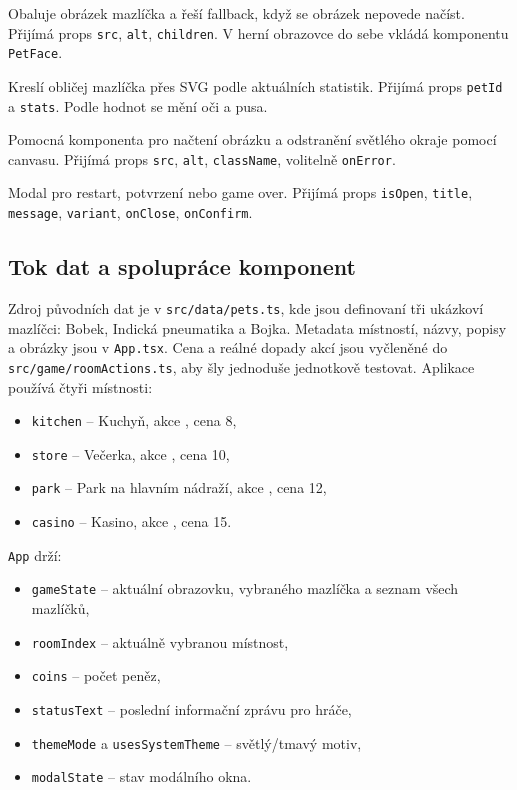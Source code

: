 \documentclass[12pt,a4paper]{article}
\begin{document}
\begin{description}[style=nextline]
  \item[\texttt{PetAvatar}] Obaluje obrázek mazlíčka a řeší fallback, když se obrázek nepovede načíst. Přijímá props \texttt{src}, \texttt{alt}, \texttt{children}. V herní obrazovce do sebe vkládá komponentu \texttt{PetFace}.

  \item[\texttt{PetFace}] Kreslí obličej mazlíčka přes SVG podle aktuálních statistik. Přijímá props \texttt{petId} a \texttt{stats}. Podle hodnot se mění oči a pusa.

  \item[\texttt{CutoutImage}] Pomocná komponenta pro načtení obrázku a odstranění světlého okraje pomocí canvasu. Přijímá props \texttt{src}, \texttt{alt}, \texttt{className}, volitelně \texttt{onError}.

  \item[\texttt{StatusModal}] Modal pro restart, potvrzení nebo game over. Přijímá props \texttt{isOpen}, \texttt{title}, \texttt{message}, \texttt{variant}, \texttt{onClose}, \texttt{onConfirm}.
\end{description}

\subsection*{Tok dat a spolupráce komponent}

Zdroj původních dat je v \texttt{src/data/pets.ts}, kde jsou definovaní tři ukázkoví mazlíčci: Bobek, Indická pneumatika a Bojka. Metadata místností, názvy, popisy a obrázky jsou v \texttt{App.tsx}. Cena a reálné dopady akcí jsou vyčleněné do \texttt{src/game/roomActions.ts}, aby šly jednoduše jednotkově testovat. Aplikace používá čtyři místnosti:
\begin{itemize}[leftmargin=2em]
  \item \texttt{kitchen} -- Kuchyň, akce , cena 8,
  \item \texttt{store} -- Večerka, akce , cena 10,
  \item \texttt{park} -- Park na hlavním nádraží, akce , cena 12,
  \item \texttt{casino} -- Kasino, akce , cena 15.
\end{itemize}

\texttt{App} drží:
\begin{itemize}[leftmargin=2em]
  \item \texttt{gameState} -- aktuální obrazovku, vybraného mazlíčka a seznam všech mazlíčků,
  \item \texttt{roomIndex} -- aktuálně vybranou místnost,
  \item \texttt{coins} -- počet peněz,
  \item \texttt{statusText} -- poslední informační zprávu pro hráče,
  \item \texttt{themeMode} a \texttt{usesSystemTheme} -- světlý/tmavý motiv,
  \item \texttt{modalState} -- stav modálního okna.
\end{itemize}
\end{document}
